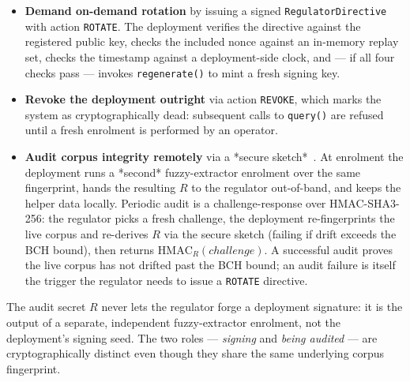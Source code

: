\begin{itemize}
  \item \textbf{Demand on-demand rotation} by issuing a signed
        \texttt{RegulatorDirective} with action \texttt{ROTATE}.
        The deployment verifies the directive against the registered
        public key, checks the included nonce against an in-memory
        replay set, checks the timestamp against a deployment-side
        clock, and — if all four checks pass — invokes
        \texttt{regenerate()} to mint a fresh signing key.
  \item \textbf{Revoke the deployment outright} via action
        \texttt{REVOKE}, which marks the system as
        cryptographically dead: subsequent calls to
        \texttt{query()} are refused until a fresh enrolment is
        performed by an operator.
  \item \textbf{Audit corpus integrity remotely} via a *secure
        sketch*~\cite{dodis2008fuzzy}.  At enrolment the deployment
        runs a *second* fuzzy\nobreakdash-extractor enrolment over
        the same fingerprint, hands the resulting $R$ to the
        regulator out\nobreakdash-of\nobreakdash-band, and keeps the
        helper data locally.  Periodic audit is a
        challenge\nobreakdash-response over HMAC\nobreakdash-SHA3-256:
        the regulator picks a fresh challenge, the deployment
        re\nobreakdash-fingerprints the live corpus and re\nobreakdash-derives
        $R$ via the secure sketch (failing if drift exceeds the BCH
        bound), then returns
        $\mathrm{HMAC}_{R}(\mathit{challenge})$.  A successful
        audit proves the live corpus has not drifted past the BCH
        bound; an audit failure is itself the trigger the regulator
        needs to issue a \texttt{ROTATE} directive.
\end{itemize}

The audit secret $R$ never lets the regulator forge a deployment
signature: it is the output of a separate, independent
fuzzy\nobreakdash-extractor enrolment, not the deployment's signing
seed.  The two roles — \emph{signing} and \emph{being audited} —
are cryptographically distinct even though they share the same
underlying corpus fingerprint.

